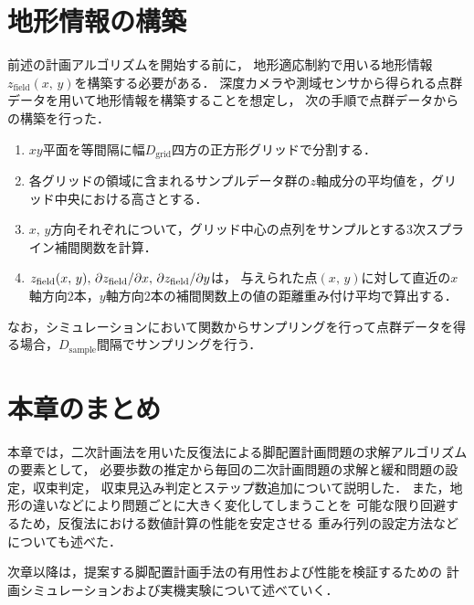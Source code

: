 \documentclass[autodetect-engine,dvipdfmx-if-dvi,ja=standard,a4j,jbase=11pt,magstyle=nomag*]{bxjsreport}
\begin{document}
\section{地形情報の構築}
\label{sec:z_field_constructure}
前述の計画アルゴリズムを開始する前に，
地形適応制約で用いる地形情報$z_\mathrm{field}(x ,\, y)$を構築する必要がある．
深度カメラや測域センサから得られる点群データを用いて地形情報を構築することを想定し，
次の手順で点群データからの構築を行った．
\begin{enumerate}
    \item   $xy$平面を等間隔に幅$D_\mathrm{grid}$四方の正方形グリッドで分割する．
    \item   各グリッドの領域に含まれるサンプルデータ群の$z$軸成分の平均値を，グリッド中央における高さとする．
    \item   $x ,\, y$方向それぞれについて，グリッド中心の点列をサンプルとする3次スプライン補間関数を計算．
    \item   $z_{\mathrm{field}} ( x ,\, y ) ,\, \partial z_{\mathrm{field}} / \partial x ,\, \partial z_{\mathrm{field}} / \partial y$は，
    与えられた点$( x ,\, y )$に対して直近の$x$軸方向$2$本，$y$軸方向$2$本の補間関数上の値の距離重み付け平均で算出する．
\end{enumerate}
なお，シミュレーションにおいて関数からサンプリングを行って点群データを得る場合，$D_\mathrm{sample}$間隔でサンプリングを行う．


\section{本章のまとめ}
本章では，二次計画法を用いた反復法による脚配置計画問題の求解アルゴリズムの要素として，
必要歩数の推定から毎回の二次計画問題の求解と緩和問題の設定，収束判定，
収束見込み判定とステップ数追加について説明した．
また，地形の違いなどにより問題ごとに大きく変化してしまうことを
可能な限り回避するため，反復法における数値計算の性能を安定させる
重み行列の設定方法などについても述べた．

次章以降は，提案する脚配置計画手法の有用性および性能を検証するための
計画シミュレーションおよび実機実験について述べていく．
\end{document}
